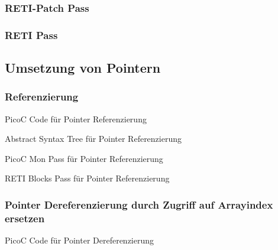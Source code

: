 \subsubsection{RETI-Patch Pass}
\subsubsection{RETI Pass}

\subsection{Umsetzung von Pointern}
\subsubsection{Referenzierung}
\begin{code}
  \centering
  \caption{PicoC Code für Pointer Referenzierung}
  \label{fig:picoc_code_für_pointer_referenzierung}
\end{code}

\begin{code}
  \centering
  \caption{Abstract Syntax Tree für Pointer Referenzierung}
  \label{fig:abstract_syntax_tree_für_pointer_referenzierung}
\end{code}

\begin{code}
  \centering
  \caption{PicoC Mon Pass für Pointer Referenzierung}
  \label{fig:picoc_mon_für_pointer_referenzierung}
\end{code}

\begin{code}
  \centering
  \caption{RETI Blocks Pass für Pointer Referenzierung}
  \label{fig:reti_blocks_für_pointer_referenzierung}
\end{code}
\subsubsection{Pointer Dereferenzierung durch Zugriff auf Arrayindex ersetzen}
\begin{code}
  \centering
  \caption{PicoC Code für Pointer Dereferenzierung}
  \label{fig:picoc_code_für_pointer_dereferenzierung}
\end{code}

